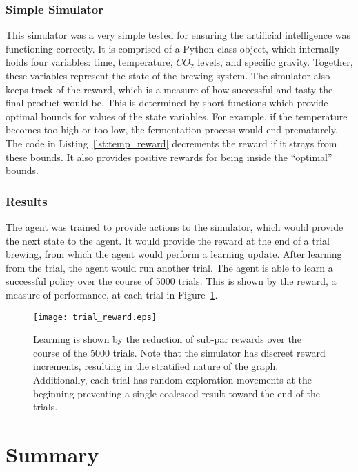 \documentclass[draftclsnofoot,onecolumn,letterpaper,10pt]{IEEEtran}
\begin{document}
\subsubsection{Simple Simulator}
This simulator was a very simple tested for ensuring the artificial intelligence was functioning correctly. It is comprised of a Python class object, which internally holds four variables: time, temperature, $CO_2$ levels, and specific gravity. Together, these variables represent the state of the brewing system. The simulator also keeps track of the reward, which is a measure of how successful and tasty the final product would be. This is determined by short functions which provide optimal bounds for values of the state variables. For example, if the temperature becomes too high or too low, the fermentation process would end prematurely. The code in Listing~\ref{lst:temp_reward} decrements the reward if it strays from these bounds. It also provides positive rewards for being inside the ``optimal'' bounds.
\label{lst:temp_reward}

\subsubsection{Results}\label{sec:AI-Results}
The agent was trained to provide actions to the simulator, which would provide the next state to the agent. It would provide the reward at the end of a trial brewing, from which the agent would perform a learning update. After learning from the trial, the agent would run another trial. The agent is able to learn a successful policy over the course of 5000 trials. This is shown by the reward, a measure of performance, at each trial in Figure~\ref{fig:trial_graph}. 
\begin{figure}[h]
\label{fig:trial_graph}
\caption{Learning is shown by the reduction of sub-par rewards over the course of the 5000 trials. Note that the simulator has discreet reward increments, resulting in the stratified nature of the graph. Additionally, each trial has random exploration movements at the beginning preventing a single coalesced result toward the end of the trials.}
\texttt{[image: trial\_reward.eps]}
\end{figure}


\section{Summary}
\end{document}
